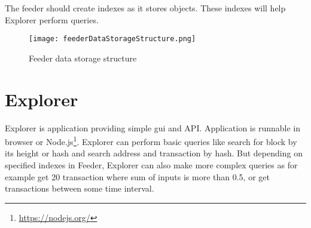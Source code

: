 The feeder should create indexes as it stores objects. These indexes will help Explorer perform queries.


\begin{figure}[h]
    \centering
    \texttt{[image: feederDataStorageStructure.png]}
    \caption{Feeder data storage structure}
    \label{feederDataStorageStructure}
\end{figure}




\section{Explorer}
Explorer is application providing simple gui and API. Application is runnable in browser or Node.js\footnote{\url{https://nodejs.org/}}. Explorer can perform basic queries like search for block by its height or hash and search address and transaction by hash. But depending on specified indexes in Feeder, Explorer can also make more complex queries as for example get 20 transaction where sum of inputs is more than 0.5, or get transactions between some time interval.



